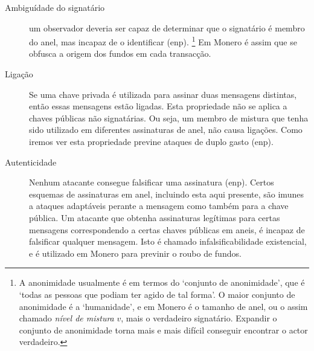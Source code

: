 \begin{description}
	\item[Ambiguídade do signatário]
	um observador deveria ser capaz de determinar que o signatário é membro do anel, mas incapaz de o identificar (enp).
\footnote{\label{anonymity_note}A anonimidade usualmente é em termos do `conjunto de anonimidade’, que é `todas as pessoas que podiam ter agido de tal forma’. O maior conjunto de anonimidade é a `humanidade’, e em Monero é o tamanho de anel, ou o assim chamado {\em nível de mistura} $v$, mais o verdadeiro signatário. Expandir o conjunto de anonimidade torna mais e mais difícil conseguir encontrar o actor verdadeiro.} 
Em Monero é assim que se obfusca a origem dos fundos em cada transacção.

	\item[Ligação]
	Se uma chave privada é utilizada para assinar duas mensagens distintas, então essas mensagens estão ligadas. Esta propriedade não se aplica a chaves públicas não signatárias. Ou seja, um membro de mistura que tenha sido utilizado em diferentes assinaturas de anel, não causa ligações. Como iremos ver esta propriedade previne ataques de duplo gasto (enp).	

	\item[Autenticidade]
	Nenhum atacante consegue falsificar uma assinatura (enp).    
Certos esquemas de assinaturas em anel, incluindo esta aqui presente, são imunes a ataques adaptáveis perante a mensagem como também para a chave pública. Um atacante que obtenha assinaturas legítimas para certas mensagens correspondendo a certas chaves públicas em aneis, é incapaz de falsificar qualquer mensagem. Isto é chamado infalsificabilidade existencial, e é utilizado em Monero para previnir o roubo de fundos.	


\end{description}
